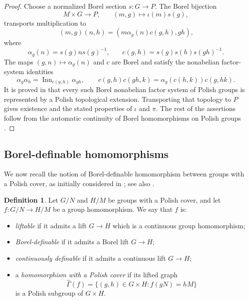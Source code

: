 \documentclass[12pt]{amsart}
\theoremstyle{definition}
\newtheorem{definition}[theorem]{Definition}
\newcommand{\func}[1]{\operatorname{#1}}
\begin{document}
\begin{proof}
Choose a normalized Borel section $s:G\rightarrow P$. The Borel bijection 
\begin{equation*}
M\times G\longrightarrow P\text{,}\qquad (m,g)\longmapsto \iota (m)s(g),
\end{equation*}%
transports multiplication to 
\begin{equation*}
(m,g)(n,h)=(m\alpha _{g}(n)c(g,h),gh)\text{,}
\end{equation*}%
where 
\begin{equation*}
\alpha _{g}(n)=s(g)ns(g)^{-1}\text{,}\qquad c(g,h)=s(g)s(h)s(gh)^{-1}\text{.}
\end{equation*}%
The maps $(g,n)\mapsto \alpha _{g}(n)$ and $c$ are Borel and satisfy the
nonabelian factor-system identities 
\begin{equation*}
\alpha _{g}\alpha _{h}=\func{Inn}_{c(g,h)}\alpha _{gh},\qquad
c(g,h)c(gh,k)=\alpha _{g}(c(h,k))c(g,hk).
\end{equation*}%
It is proved in \cite[Theorem, p.~73]{brown_extensions_1971} that every such
Borel nonabelian factor system of Polish groups is represented by a Polish
topological extension. Transporting that topology to $P$ gives existence and
the stated properties of $\iota $ and $\pi $. The rest of the assertions
follow from the automatic continuity of Borel homomorphisms on Polish groups 
\cite[Theorem~9.10]{kechris_classical_1995}.
\end{proof}

\subsection{Borel-definable homomorphisms}

We now recall the notion of Borel-definable homomorphism between groups with
a Polish cover, as initially considered in \cite%
{bergfalk_definable_2024,bergfalk_definable_2024-1}; see also \cite%
{lupini_looking_2024}.

\begin{definition}
\label{Definition:homo-Polish-cover} Let $G/N$ and $H/M$ be groups with a
Polish cover, and let $f:G/N\rightarrow H/M$ be a group homomorphism. We say
that $f$ is:

\begin{itemize}
\item \emph{liftable} if it admits a lift $G\rightarrow H$ which is a
continuous group homomorphism;

\item \emph{Borel-definable} if it admits a Borel lift $G\rightarrow H$;

\item \emph{continuously definable} if it admits a continuous lift $%
G\rightarrow H$;

\item a \emph{homomorphism with a Polish cover} if its lifted graph 
\begin{equation*}
\widehat{\Gamma }(f)=\{(g,h)\in G\times H:f(gN)=hM\}
\end{equation*}%
is a Polish subgroup of $G\times H$.
\end{itemize}
\end{definition}
\end{document}

